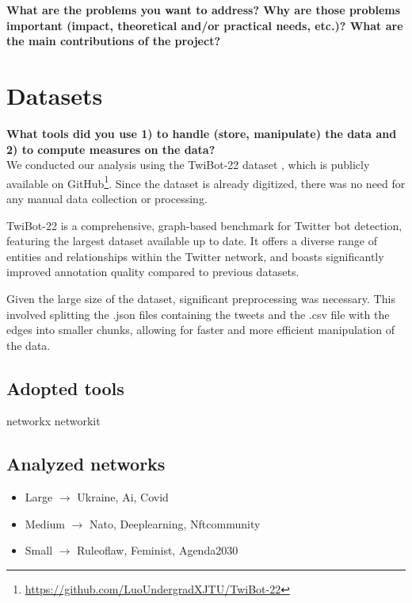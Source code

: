 \documentclass[12pt, a4paper]{article}
\begin{document}
	\textbf{What are the problems you want to address? Why are those problems important (impact, theoretical and/or practical needs, etc.)? What are the main contributions of the project?}


\section{Datasets}
	\label{datasets}
	
	\textbf{What tools did you use 1) to handle (store, manipulate) the data and 2) to compute measures on the data?}\\
	
	We conducted our analysis using the TwiBot-22 dataset \cite{twibot22}, which is publicly available on GitHub\footnote{\href{https://github.com/LuoUndergradXJTU/TwiBot-22}{https://github.com/LuoUndergradXJTU/TwiBot-22}}. Since the dataset is already digitized, there was no need for any manual data collection or processing.
	\vspace{0.1cm}
	
	TwiBot-22 is a comprehensive, graph-based benchmark for Twitter bot detection, featuring the largest dataset available up to date. It offers a diverse range of entities and relationships within the Twitter network, and boasts significantly improved annotation quality compared to previous datasets.
	\vspace{0.1cm}
	
	Given the large size of the dataset, significant preprocessing was necessary. This involved splitting the .json files containing the tweets and the .csv file with the edges into smaller chunks, allowing for faster and more efficient manipulation of the data.
	
	\subsection{Adopted tools}
		
		networkx networkit
		
	\subsection{Analyzed networks}
		\begin{itemize}
			\item Large $\rightarrow$ Ukraine, Ai, Covid
			\item Medium $\rightarrow$ Nato, Deeplearning, Nftcommunity
			\item Small $\rightarrow$ Ruleoflaw, Feminist, Agenda2030
		\end{itemize}
\end{document}
